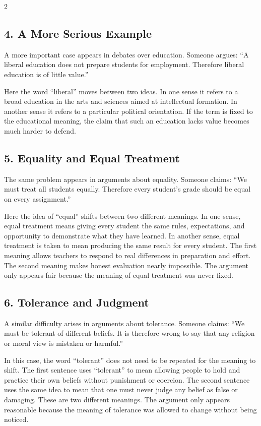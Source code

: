 \documentclass[12pt]{article}
\begin{document}
\begin{multicols}{2}
\subsection*{4. A More Serious Example}
A more important case appears in debates over education. Someone argues: “A liberal education does not prepare students for employment. Therefore liberal education is of little value.”

Here the word “liberal” moves between two ideas. In one sense it refers to a broad education in the arts and sciences aimed at intellectual formation. In another sense it refers to a particular political orientation. If the term is fixed to the educational meaning, the claim that such an education lacks value becomes much harder to defend.

\subsection*{5. Equality and Equal Treatment}
The same problem appears in arguments about equality. Someone claims: “We must treat all students equally. Therefore every student’s grade should be equal on every assignment.”

Here the idea of “equal” shifts between two different meanings. In one sense, equal treatment means giving every student the same rules, expectations, and opportunity to demonstrate what they have learned. In another sense, equal treatment is taken to mean producing the same result for every student. The first meaning allows teachers to respond to real differences in preparation and effort. The second meaning makes honest evaluation nearly impossible. The argument only appears fair because the meaning of equal treatment was never fixed.

\subsection*{6. Tolerance and Judgment}
A similar difficulty arises in arguments about tolerance. Someone claims: “We must be tolerant of different beliefs. It is therefore wrong to say that any religion or moral view is mistaken or harmful.”

In this case, the word “tolerant” does not need to be repeated for the meaning to shift. The first sentence uses “tolerant” to mean allowing people to hold and practice their own beliefs without punishment or coercion. The second sentence uses the same idea to mean that one must never judge any belief as false or damaging. These are two different meanings. The argument only appears reasonable because the meaning of tolerance was allowed to change without being noticed.


\end{multicols}
\end{document}
